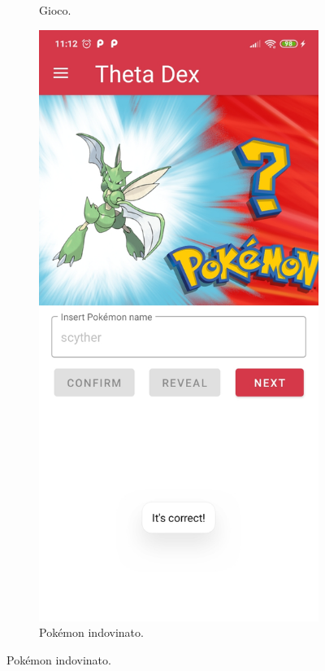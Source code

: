 \documentclass[a4paper,11pt]{article}
\begin{document}
\begin{figure}[h!]
{\begin{subfigure}[b]{0.4\linewidth}
    \caption{Gioco.}
  \end{subfigure}
  \begin{subfigure}[b]{0.4\linewidth}
    \includegraphics[width=\linewidth]{who_correct.jpg}
    \caption{Pokémon indovinato.}
  \end{subfigure}
  }
\end{figure}
\newpage
\end{document}
